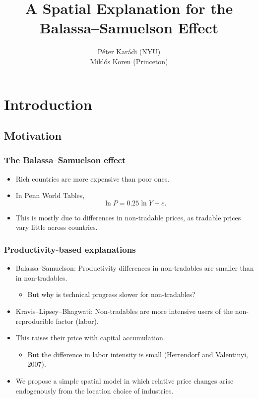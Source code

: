 \documentclass[handout,compress,mathserif]{beamer}
\title[Balassa--Samuelson]%
{A Spatial Explanation for the Balassa--Samuelson Effect}
\author[Kar\'adi and Koren] %
{P\'eter Kar\'adi (NYU)\\
Mikl\'os Koren (Princeton)}
\date %
{}
\begin{document}
\begin{frame}[plain]
  \titlepage
    \addtocounter{framenumber}{-1}
\end{frame}


\section{Introduction}
\subsection{Motivation}
\begin{frame}\frametitle{The Balassa--Samuelson effect}

\begin{itemize}
    \item Rich countries are more expensive than poor ones.
    \item In Penn World Tables,
    \[
    \ln P = 0.25\ln Y + e.
    \]
    \item This is mostly due to differences in non-tradable prices, as tradable prices vary little across countries.
\end{itemize}
\end{frame}


\begin{frame}\frametitle{Productivity-based explanations}

\begin{itemize}
    \item Balassa--Samuelson: Productivity differences in non-tradables are smaller than in non-tradables.
        \begin{itemize}
            \item But why is technical progress slower for non-tradables?
        \end{itemize}
\pause
    \item Kravis--Lipsey--Bhagwati: Non-tradables are more intensive users of the non-reproducible factor (labor).
    \item This raises their price with capital accumulation.
        \begin{itemize}
            \item But the difference in labor intensity is small (Herrendorf and Valentinyi, 2007).
        \end{itemize}
\pause
    \item We propose a simple spatial model in which relative price changes arise endogenously from the location choice of industries.
\end{itemize}
\end{frame}
\end{document}
